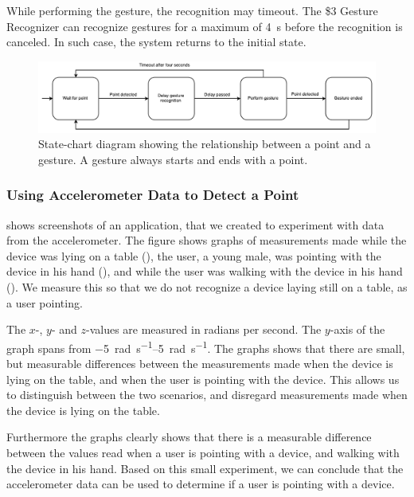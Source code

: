 While performing the gesture, the recognition may timeout. 
The \$3 Gesture Recognizer can recognize gestures for a maximum of \SI{4}{\second} before the recognition is canceled. 
In such case, the system returns to the initial state.

\begin{figure}[h]
\centering
\includegraphics[width=\textwidth]{images/point-to-gesture-state-diagram}
\caption{State-chart diagram showing the relationship between a point and a gesture. A gesture always starts and ends with a point.}
\label{fig:point-to-gesture-state-diagram}
\end{figure}

\subsubsection{Using Accelerometer Data to Detect a Point}

 shows screenshots of an application, 
that we created to experiment with data from the accelerometer. 
The figure shows graphs of measurements made while the device was lying on a table (), 
the user, a young male, was pointing with the device in his hand (), 
and while the user was walking with the device in his hand ().
We measure this so that we do not recognize a device laying still on a table, 
as a user pointing.
 
The $x$-, $y$- and $z$-values are measured in radians per second. 
The $y$-axis of the graph spans from \SIrange{-5}{5}{\radian\per\second}. 
The graphs shows that there are small, 
but measurable differences between the measurements made when the device is lying on the table,
and when the user is pointing with the device. 
This allows us to distinguish between the two scenarios, 
and disregard measurements made when the device is lying on the table. 

Furthermore the graphs clearly shows that there is a measurable difference between the values read when a user is pointing with a device, 
and walking with the device in his hand. 
Based on this small experiment, 
we can conclude that the accelerometer data can be used to determine if a user is pointing with a device.


